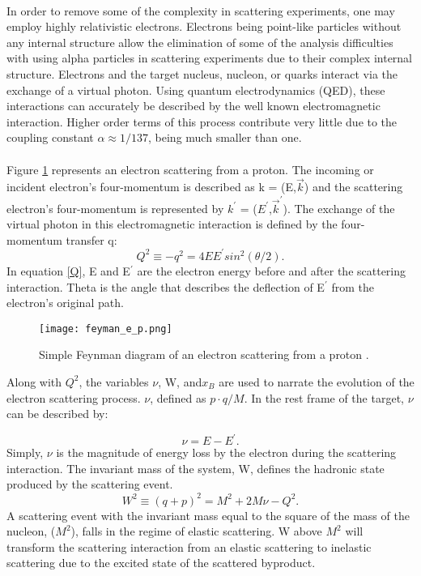 \paragraph{} In order to remove some of the complexity in scattering experiments, one may employ highly relativistic electrons. Electrons being point-like particles without any internal structure allow the elimination of some of the analysis difficulties with using alpha particles in scattering experiments due to their complex internal structure. Electrons and the target nucleus, nucleon, or quarks interact via the exchange of a virtual photon. Using quantum electrodynamics (QED), these interactions can accurately be described by the well known electromagnetic interaction. Higher order terms of this process contribute very little due to the coupling constant $\alpha \approx 1/137 $, being much smaller than one. 
\paragraph{} Figure \ref{feynman} represents an electron scattering from a proton. The incoming or incident electron's four-momentum is described as k = (E,$ \vec{k}$) and the scattering electron's four-momentum is represented by $k^\prime{}$ = ($E^\prime{}$,$\vec{k}^\prime{}$). The exchange of the virtual photon in this electromagnetic interaction is defined by the four-momentum transfer q: 
\begin{equation}
\label{Q}
Q^2 \equiv -q^2 = 4EE^\prime{} sin^2(\theta/2).
\end{equation} 
In equation \ref{Q}, E and E$^\prime$ are the electron energy before and after the scattering interaction. Theta is the angle that describes the deflection of E$^\prime$ from the electron's original path. 

\begin{figure}[h]
\centering
\caption{Simple Feynman diagram of an electron scattering from a proton \cite{Flay}.}
\texttt{[image: feyman\_e\_p.png]}
\label{feynman}
\end{figure}
Along with $Q^2$, the variables $\nu$, W, and$x_B$  are used to narrate the evolution of the electron scattering process. $\nu$, defined as $p\cdot q/M$. In the rest frame of the target,  $\nu$ can be described by:

\begin{equation}
\label{v}
\nu = E - E^\prime{}.
\end{equation}
Simply, $\nu$ is the magnitude of energy loss by the electron during the scattering interaction. The invariant mass of the system, W,  defines the hadronic state produced by the scattering event. 
\begin{equation}
\label{W}
W^2 \equiv (q + p)^2 = M^2 + 2M\nu -Q^2.
\end{equation}
A scattering event with the invariant mass equal to the square of the mass of the nucleon, ($M^2$), falls in the regime of elastic scattering. W above $M^2$ will transform the scattering interaction from an elastic scattering to inelastic scattering due to the excited state of the scattered byproduct. 
